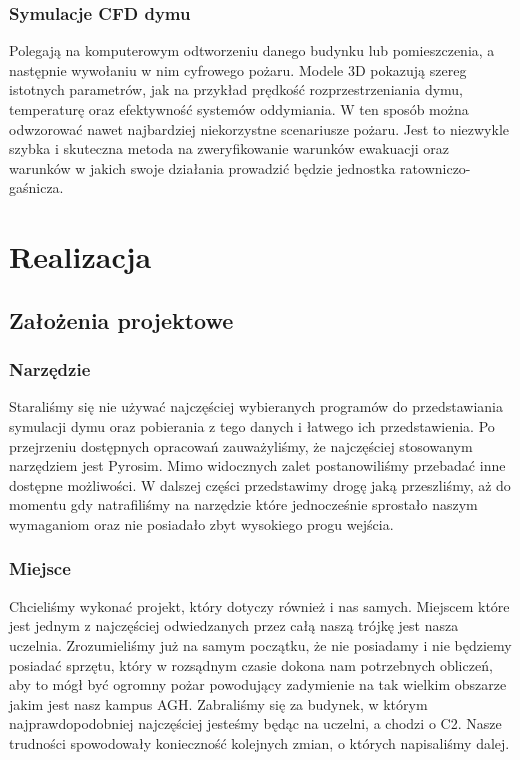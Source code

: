 \documentclass{article}
\begin{document}
        \subsubsection{Symulacje CFD dymu}    
        Polegają na komputerowym odtworzeniu danego budynku lub pomieszczenia, a następnie wywołaniu w nim cyfrowego pożaru. Modele 3D pokazują szereg istotnych parametrów, jak na przykład prędkość rozprzestrzeniania dymu, temperaturę oraz efektywność systemów oddymiania. W ten sposób można odwzorować nawet najbardziej niekorzystne scenariusze pożaru. Jest to niezwykle szybka i skuteczna metoda na zweryfikowanie warunków ewakuacji oraz warunków w jakich swoje działania prowadzić będzie jednostka ratowniczo-gaśnicza.


    \section{Realizacja}
        \subsection{Założenia projektowe}
        
            \subsubsection{Narzędzie}
            Staraliśmy się nie używać najczęściej wybieranych programów do przedstawiania symulacji dymu oraz pobierania z tego danych i łatwego ich przedstawienia. Po przejrzeniu dostępnych opracowań zauważyliśmy, że najczęściej stosowanym narzędziem jest Pyrosim. Mimo widocznych zalet postanowiliśmy przebadać inne dostępne możliwości. W dalszej części przedstawimy drogę jaką przeszliśmy, aż do momentu gdy natrafiliśmy na narzędzie które jednocześnie sprostało naszym wymaganiom oraz nie posiadało zbyt wysokiego progu wejścia.
            
            
            \subsubsection{Miejsce}
            Chcieliśmy wykonać projekt, który dotyczy również i nas samych. Miejscem które jest jednym z najczęściej odwiedzanych przez całą naszą trójkę jest nasza uczelnia. Zrozumieliśmy już na samym początku, że nie posiadamy i nie będziemy posiadać sprzętu, który w rozsądnym czasie dokona nam potrzebnych obliczeń, aby to mógł być ogromny pożar powodujący zadymienie na tak wielkim obszarze jakim jest nasz kampus AGH. Zabraliśmy się za budynek, w którym najprawdopodobniej najczęściej jesteśmy będąc na uczelni, a chodzi o C2. Nasze trudności spowodowały konieczność kolejnych zmian, o których napisaliśmy dalej.
            
\end{document}
